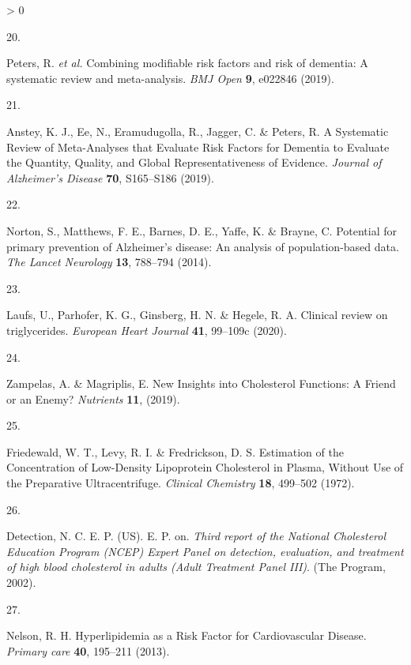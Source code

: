 \documentclass[a4paper, twoside]{templates/ociamthesis}
\newlength{\cslhangindent}
\newlength{\csllabelwidth}
\newenvironment{CSLReferences}[3] %
 {%
  \setlength{\parindent}{0pt}
  \ifodd #1 \everypar{\setlength{\hangindent}{\cslhangindent}}\ignorespaces\fi
  \ifnum #2 > 0
  \setlength{\parskip}{#2\baselineskip}
  \fi
 }%
 {}
\newcommand{\CSLLeftMargin}[1]{\parbox[t]{\maxof{\widthof{#1}}{\csllabelwidth}}{#1}}
\newcommand{\CSLRightInline}[1]{\parbox[t]{\linewidth - \csllabelwidth}{#1}}
\begin{document}
\begin{CSLReferences}{0}{0}
\leavevmode\hypertarget{ref-peters2019}{}%
\CSLLeftMargin{20. }
\CSLRightInline{Peters, R. \emph{et al.} Combining modifiable risk factors and risk of dementia: A systematic review and meta-analysis. \emph{BMJ Open} \textbf{9}, e022846 (2019).}

\leavevmode\hypertarget{ref-anstey2019}{}%
\CSLLeftMargin{21. }
\CSLRightInline{Anstey, K. J., Ee, N., Eramudugolla, R., Jagger, C. \& Peters, R. A {Systematic Review} of {Meta}-{Analyses} that {Evaluate Risk Factors} for {Dementia} to {Evaluate} the {Quantity}, {Quality}, and {Global Representativeness} of {Evidence}. \emph{Journal of Alzheimer's Disease} \textbf{70}, S165--S186 (2019).}

\leavevmode\hypertarget{ref-norton2014potential}{}%
\CSLLeftMargin{22. }
\CSLRightInline{Norton, S., Matthews, F. E., Barnes, D. E., Yaffe, K. \& Brayne, C. Potential for primary prevention of {Alzheimer}'s disease: An analysis of population-based data. \emph{The Lancet Neurology} \textbf{13}, 788--794 (2014).}

\leavevmode\hypertarget{ref-laufs2020}{}%
\CSLLeftMargin{23. }
\CSLRightInline{Laufs, U., Parhofer, K. G., Ginsberg, H. N. \& Hegele, R. A. Clinical review on triglycerides. \emph{European Heart Journal} \textbf{41}, 99--109c (2020).}

\leavevmode\hypertarget{ref-zampelas2019}{}%
\CSLLeftMargin{24. }
\CSLRightInline{Zampelas, A. \& Magriplis, E. New {Insights} into {Cholesterol Functions}: A {Friend} or an {Enemy}? \emph{Nutrients} \textbf{11}, (2019).}

\leavevmode\hypertarget{ref-friedewald1972}{}%
\CSLLeftMargin{25. }
\CSLRightInline{Friedewald, W. T., Levy, R. I. \& Fredrickson, D. S. Estimation of the {Concentration} of {Low}-{Density Lipoprotein Cholesterol} in {Plasma}, {Without Use} of the {Preparative Ultracentrifuge}. \emph{Clinical Chemistry} \textbf{18}, 499--502 (1972).}

\leavevmode\hypertarget{ref-national2002third}{}%
\CSLLeftMargin{26. }
\CSLRightInline{Detection, N. C. E. P. (US). E. P. on. \emph{Third report of the {National Cholesterol Education Program} ({NCEP}) {Expert Panel} on detection, evaluation, and treatment of high blood cholesterol in adults ({Adult Treatment Panel III})}. ({The Program}, 2002).}

\leavevmode\hypertarget{ref-nelson2013}{}%
\CSLLeftMargin{27. }
\CSLRightInline{Nelson, R. H. Hyperlipidemia as a {Risk Factor} for {Cardiovascular Disease}. \emph{Primary care} \textbf{40}, 195--211 (2013).}


\end{CSLReferences}
\end{document}
